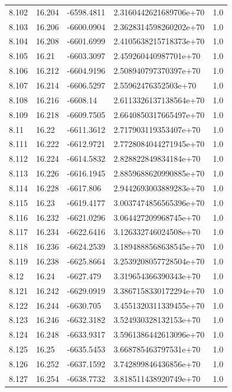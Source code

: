 \begin{tabular}{lllll}
8.102 & 16.204 & -6598.4811 & 2.3160442621689706e+70 & 1.0 \\
8.103 & 16.206 & -6600.0904 & 2.3628314598260202e+70 & 1.0 \\
8.104 & 16.208 & -6601.6999 & 2.4105638215718373e+70 & 1.0 \\
8.105 & 16.21 & -6603.3097 & 2.459260440987701e+70 & 1.0 \\
8.106 & 16.212 & -6604.9196 & 2.508940797370397e+70 & 1.0 \\
8.107 & 16.214 & -6606.5297 & 2.55962476352503e+70 & 1.0 \\
8.108 & 16.216 & -6608.14 & 2.6113326137138564e+70 & 1.0 \\
8.109 & 16.218 & -6609.7505 & 2.6640850317665497e+70 & 1.0 \\
8.11 & 16.22 & -6611.3612 & 2.717903119353407e+70 & 1.0 \\
8.111 & 16.222 & -6612.9721 & 2.7728084044271945e+70 & 1.0 \\
8.112 & 16.224 & -6614.5832 & 2.828822849834184e+70 & 1.0 \\
8.113 & 16.226 & -6616.1945 & 2.8859688620990885e+70 & 1.0 \\
8.114 & 16.228 & -6617.806 & 2.9442693003889283e+70 & 1.0 \\
8.115 & 16.23 & -6619.4177 & 3.0037474856565396e+70 & 1.0 \\
8.116 & 16.232 & -6621.0296 & 3.064427209968745e+70 & 1.0 \\
8.117 & 16.234 & -6622.6416 & 3.126332746024508e+70 & 1.0 \\
8.118 & 16.236 & -6624.2539 & 3.1894888568638545e+70 & 1.0 \\
8.119 & 16.238 & -6625.8664 & 3.2539208057728504e+70 & 1.0 \\
8.12 & 16.24 & -6627.479 & 3.319654366390343e+70 & 1.0 \\
8.121 & 16.242 & -6629.0919 & 3.3867158330172294e+70 & 1.0 \\
8.122 & 16.244 & -6630.705 & 3.4551320311339455e+70 & 1.0 \\
8.123 & 16.246 & -6632.3182 & 3.524930328132153e+70 & 1.0 \\
8.124 & 16.248 & -6633.9317 & 3.5961386442613096e+70 & 1.0 \\
8.125 & 16.25 & -6635.5453 & 3.668785463797531e+70 & 1.0 \\
8.126 & 16.252 & -6637.1592 & 3.742899846436856e+70 & 1.0 \\
8.127 & 16.254 & -6638.7732 & 3.818511438920749e+70 & 1.0 \\

\end{tabular}
